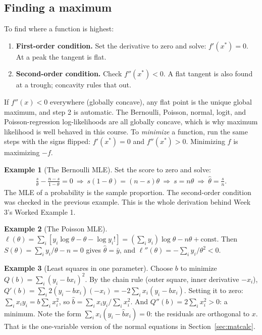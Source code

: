 \documentclass[11pt]{article}
\theoremstyle{definition}
\newtheorem{example}{Example}[section]
\newcommand{\loglik}{\ell}
\begin{document}
\subsection{Finding a maximum}
\label{sec:max}

To find where a function is highest:
\begin{enumerate}
  \item \textbf{First-order condition.} Set the derivative to zero and
        solve: $f'(x^*) = 0$. At a peak the tangent is flat.
  \item \textbf{Second-order condition.} Check $f''(x^*) < 0$. A flat
        tangent is also found at a trough; concavity rules that out.
\end{enumerate}
If $f''(x) < 0$ everywhere (globally concave), any flat point is the
unique global maximum, and step 2 is automatic. The Bernoulli, Poisson,
normal, logit, and Poisson-regression log-likelihoods are all globally
concave, which is why maximum likelihood is well behaved in this course. To
\emph{minimize} a function, run the same steps with the signs flipped:
$f'(x^*) = 0$ and $f''(x^*) > 0$. Minimizing $f$ is maximizing $-f$.

\begin{example}[The Bernoulli MLE]
Set the score to zero and solve:
\begin{align*}
  \frac{s}{\theta} - \frac{n-s}{1-\theta} = 0
  \ \Longrightarrow\ s(1-\theta) = (n-s)\theta
  \ \Longrightarrow\ s = n\theta
  \ \Longrightarrow\ \hat\theta = \frac{s}{n}.
\end{align*}
The MLE of a probability is the sample proportion. The second-order
condition was checked in the previous example. This is the whole derivation
behind Week 3's Worked Example 1.
\end{example}

\begin{example}[The Poisson MLE]
$\loglik(\theta) = \sum_i [y_i\log\theta - \theta - \log y_i!]
= (\sum_i y_i)\log\theta - n\theta + \text{const}$. Then
$S(\theta) = \sum_i y_i/\theta - n = 0$ gives $\hat\theta = \bar y$, and
$\loglik''(\theta) = -\sum_i y_i/\theta^2 < 0$.
\end{example}

\begin{example}[Least squares in one parameter]
Choose $b$ to minimize $Q(b) = \sum_i (y_i - b x_i)^2$. By the chain rule
(outer square, inner derivative $-x_i$),
$Q'(b) = \sum_i 2(y_i - bx_i)(-x_i) = -2\sum_i x_i(y_i - bx_i)$. Setting it
to zero: $\sum_i x_i y_i = b\sum_i x_i^2$, so $\hat b = \sum_i x_i y_i /
\sum_i x_i^2$. And $Q''(b) = 2\sum_i x_i^2 > 0$: a minimum. Note the form
$\sum_i x_i(y_i - \hat b x_i) = 0$: the residuals are orthogonal to $x$.
That is the one-variable version of the normal equations in
Section~\ref{sec:matcalc}.
\end{example}
\end{document}
